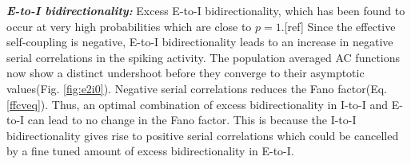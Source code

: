 \emph{\textbf{E-to-I bidirectionality:}} Excess E-to-I bidirectionality, which has been found to occur at very high probabilities which are close to $p=1$.[ref] %
Since the effective self-coupling is negative, E-to-I bidirectionality leads to an increase in negative serial correlations in the spiking activity. The population averaged AC functions now show a distinct undershoot before they converge to their asymptotic values(Fig. \ref{fig:e2i0}). Negative serial correlations reduces the Fano factor(Eq. \ref{ffcveq}). Thus, an optimal combination of excess bidirectionality in I-to-I and E-to-I can lead to no change in the Fano factor. This is because the I-to-I bidirectionality gives rise to positive serial correlations which could be cancelled by a fine tuned amount of excess bidirectionality in E-to-I. \\

